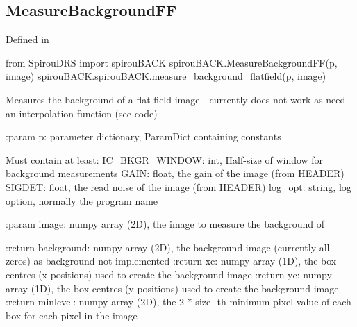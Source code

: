 \noindent\begin{minipage}{\textwidth}
\subsection{MeasureBackgroundFF}

Defined in \spirouBACK{}

\begin{pythonbox}
from SpirouDRS import spirouBACK
spirouBACK.MeasureBackgroundFF(p, image)
spirouBACK.spirouBACK.measure_background_flatfield(p, image)
\end{pythonbox}

\begin{pythondocstring}
Measures the background of a flat field image - currently does not work
as need an interpolation function (see code)

:param p: parameter dictionary, ParamDict containing constants

        Must contain at least:
            IC_BKGR_WINDOW: int, Half-size of window for background
                            measurements
            GAIN: float, the gain of the image (from HEADER)
            SIGDET: float, the read noise of the image (from HEADER)
            log_opt: string, log option, normally the program name

:param image: numpy array (2D), the image to measure the background of

:return background: numpy array (2D), the background image (currently all
                    zeros) as background not implemented
:return xc: numpy array (1D), the box centres (x positions) used to create
            the background image
:return yc: numpy array (1D), the box centres (y positions) used to create
            the background image
:return minlevel: numpy array (2D), the 2 * size -th minimum pixel value
                  of each box for each pixel in the image
\end{pythondocstring}
\end{minipage}

